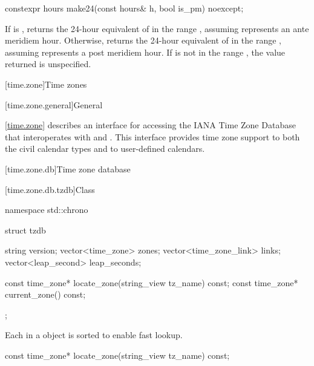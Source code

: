 %
\begin{itemdecl}
constexpr hours make24(const hours& h, bool is_pm) noexcept;
\end{itemdecl}

\begin{itemdescr}
\pnum
\returns
If  is ,
returns the 24-hour equivalent of 
in the range ,
assuming  represents an ante meridiem hour.
Otherwise,
returns the 24-hour equivalent of 
in the range ,
assuming  represents a post meridiem hour.
If  is not in the range ,
the value returned is unspecified.
\end{itemdescr}

[time.zone]{Time zones}

[time.zone.general]{General}

\pnum
\ref{time.zone} describes an interface for accessing
the IANA Time Zone Database\supercite{iana-tz}
that interoperates with  and .
This interface provides time zone support to
both the civil calendar types
and to user-defined calendars.

[time.zone.db]{Time zone database}

[time.zone.db.tzdb]{Class }

\begin{codeblock}
namespace std::chrono {
  struct tzdb {
    string                 version;
    vector<time_zone>      zones;
    vector<time_zone_link> links;
    vector<leap_second>    leap_seconds;

    const time_zone* locate_zone(string_view tz_name) const;
    const time_zone* current_zone() const;
  };
}
\end{codeblock}

\pnum
Each  in a  object
is sorted to enable fast lookup.

%
\begin{itemdecl}
const time_zone* locate_zone(string_view tz_name) const;
\end{itemdecl}

